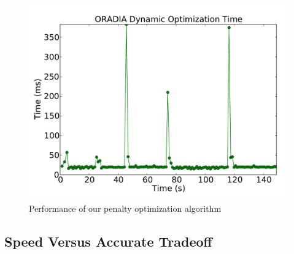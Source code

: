 \begin{figure}[!t]
	\begin{center}	
		\includegraphics[bb=0 0 576 432,width=\columnwidth]{opt_time-2vid.pdf}
		\caption{Performance of our penalty optimization algorithm}
		\label{optimization_perf_2vid}
	\end{center}
\end{figure}

\subsection*{Speed Versus Accurate Tradeoff}